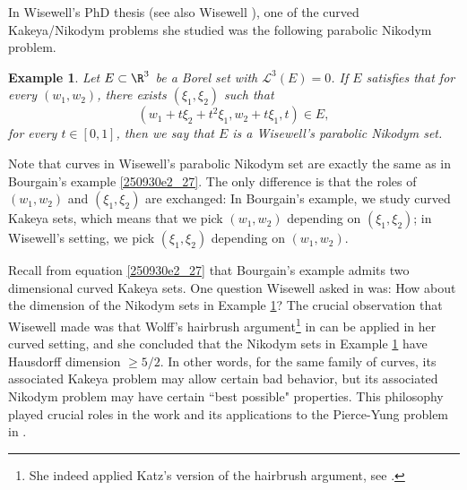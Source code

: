 \documentclass{article}
\numberwithin{equation}{section}
\theoremstyle{plain}
\newtheorem{example}[theorem]{Example}
\begin{document}
In Wisewell's PhD thesis \cite{Wis03} (see also Wisewell \cite{Wis05}), one of the curved Kakeya/Nikodym problems she studied was the following parabolic Nikodym problem. 
\begin{example}\label{250930ex2_12}
Let $E\subset \R^3$ be a Borel set with $\mathcal{L}^3(E)=0$. If $E$ satisfies that for every $(w_1, w_2)$, there exists $(\xi_1, \xi_2)$ such that 
\begin{equation}\label{250930e2_29z}
(w_1+ t\xi_2+ t^2\xi_1, w_2+ t\xi_1, t)\in E, 
\end{equation}
for every $t\in [0, 1]$, then we say that $E$ is a Wisewell's parabolic Nikodym set. 
\end{example}

Note that curves in Wisewell's parabolic Nikodym set are exactly the same as in Bourgain's example \eqref{250930e2_27}. The only difference is that the roles of $(w_1, w_2)$ and $(\xi_1, \xi_2)$ are exchanged: In Bourgain's example, we study curved Kakeya sets, which means that we pick $(w_1, w_2)$ depending on $(\xi_1, \xi_2)$; in Wisewell's setting, we pick $(\xi_1, \xi_2)$ depending on $(w_1, w_2)$. 



Recall from equation \ref{250930e2_27} that Bourgain's example admits two dimensional curved Kakeya sets. One question Wisewell asked in \cite{Wis03} was: How about the dimension of the Nikodym sets in Example \ref{250930ex2_12}? The crucial observation that Wisewell made was that Wolff's hairbrush argument\footnote{She indeed applied Katz's version of the hairbrush argument, see \cite{Wis03}.} in \cite{Wol95} can be applied in her curved setting, and she concluded that the Nikodym sets in Example \ref{250930ex2_12} have Hausdorff dimension $\ge 5/2$. In other words, for the same family of curves, its associated Kakeya problem may allow certain bad behavior, but its associated Nikodym problem may have certain ``best possible" properties. This philosophy played crucial roles in the work \cite{CGGHIW24} and its applications to the Pierce-Yung problem in \cite{BGH25}. \\
\end{document}
